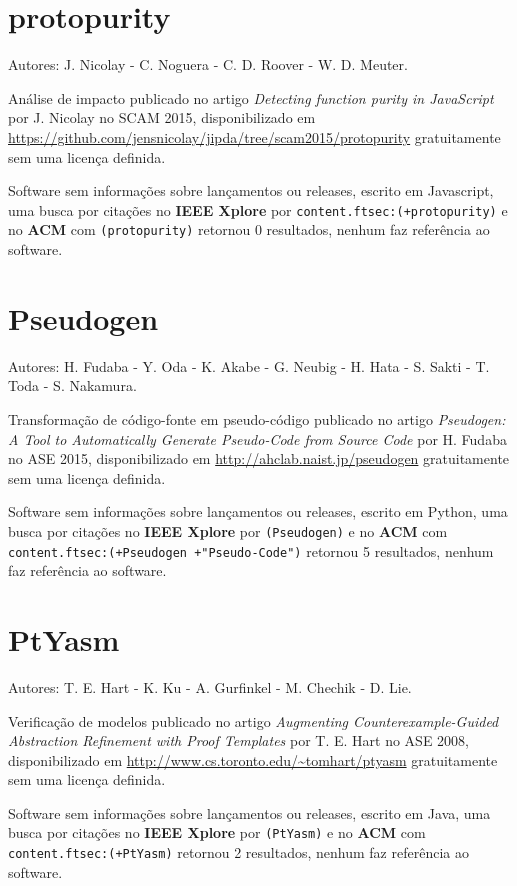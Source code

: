 \section{protopurity}

Autores:
J. Nicolay - C. Noguera - C. D. Roover - W. D. Meuter.

Análise de impacto
publicado no artigo {\it Detecting function purity in JavaScript}
por J. Nicolay
no SCAM 2015,
disponibilizado em \url{https://github.com/jensnicolay/jipda/tree/scam2015/protopurity}
gratuitamente
sem uma licença definida.

Software sem informações sobre lançamentos ou releases,
escrito em Javascript,
uma busca por citações no {\bf IEEE Xplore} por
\texttt{content.ftsec:(+protopurity)}
e no {\bf ACM} com
\texttt{(protopurity)}
retornou
0 resultados,
nenhum faz referência ao software.


\section{Pseudogen}

Autores:
H. Fudaba - Y. Oda - K. Akabe - G. Neubig - H. Hata - S. Sakti - T. Toda - S. Nakamura.

Transformação de código-fonte em pseudo-código
publicado no artigo {\it Pseudogen: A Tool to Automatically Generate Pseudo-Code from Source Code}
por H. Fudaba
no ASE 2015,
disponibilizado em \url{http://ahclab.naist.jp/pseudogen}
gratuitamente
sem uma licença definida.

Software sem informações sobre lançamentos ou releases,
escrito em Python,
uma busca por citações no {\bf IEEE Xplore} por
\texttt{(Pseudogen)}
e no {\bf ACM} com
\texttt{content.ftsec:(+Pseudogen +"Pseudo-Code")}
retornou
5 resultados,
nenhum faz referência ao software.


\section{PtYasm}

Autores:
T. E. Hart - K. Ku - A. Gurfinkel - M. Chechik - D. Lie.

Verificação de modelos
publicado no artigo {\it Augmenting Counterexample-Guided Abstraction Refinement with Proof Templates}
por T. E. Hart
no ASE 2008,
disponibilizado em \url{http://www.cs.toronto.edu/~tomhart/ptyasm}
gratuitamente
sem uma licença definida.

Software sem informações sobre lançamentos ou releases,
escrito em Java,
uma busca por citações no {\bf IEEE Xplore} por
\texttt{(PtYasm)}
e no {\bf ACM} com
\texttt{content.ftsec:(+PtYasm)}
retornou
2 resultados,
nenhum faz referência ao software.


